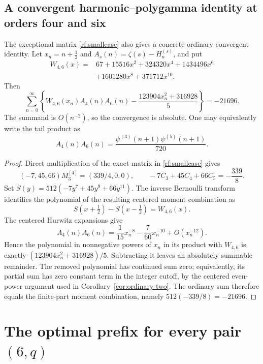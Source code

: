 \documentclass[11pt,a4paper]{article}
\numberwithin{equation}{section}
\theoremstyle{plain}
\theoremstyle{definition}
\theoremstyle{remark}
\begin{document}
\subsection{A convergent harmonic--polygamma identity at orders four and six}

The exceptional matrix \eqref{rf:smallcase} also gives a concrete
ordinary convergent identity.  Let $x_n=n+\tfrac12$ and
$A_s(n)=\zeta(s)-H_n^{(s)}$, and put
\[
 \begin{split}
 W_{4,6}(x)={}&67+15516x^2+324320x^4+1434496x^6\\
              &+1601280x^8+371712x^{10}.
 \end{split}
\]
Then
\begin{equation}\label{rf:ordinary-46}
 \boxed{\displaystyle
 \sum_{n=0}^{\infty}\left\{
 W_{4,6}(x_n)A_4(n)A_6(n)
 -\frac{123904x_n^2+316928}{5}\right\}=-21696.}
\end{equation}
The summand is $O(n^{-2})$, so the convergence is absolute.
One may equivalently write the tail product as
\[
 A_4(n)A_6(n)
 =\frac{\psi^{(3)}(n+1)\psi^{(5)}(n+1)}{720}.
\]

\begin{proof}
Direct multiplication of the exact matrix in
\eqref{rf:smallcase} gives
\[
 (-7,45,66)M_3^{[4]}=(339/4,0,0),
 \qquad -7C_3+45C_4+66C_5=-\frac{339}{8}.
\]
Set $S(y)=512(-7y^7+45y^9+66y^{11})$.  The inverse Bernoulli
transform identifies the polynomial of the resulting centered
moment combination as
\[
 S(x+\tfrac12)-S(x-\tfrac12)=W_{4,6}(x).
\]
The centered Hurwitz expansions give
\[
 A_4(n)A_6(n)=\frac1{15}x_n^{-8}
              -\frac7{60}x_n^{-10}+O(x_n^{-12}).
\]
Hence the polynomial in nonnegative powers of $x_n$ in its product
with $W_{4,6}$ is exactly
$(123904x_n^2+316928)/5$.  Subtracting it leaves an absolutely
summable remainder.  The removed polynomial has continued sum zero;
equivalently, its partial sum has zero constant term in the integer cutoff, by the
centered even-power argument used in
Corollary~\ref{cor:ordinary-two}.  The ordinary sum therefore equals
the finite-part moment combination, namely
$512(-339/8)=-21696$.
\end{proof}



\section{The optimal prefix for every pair \texorpdfstring{$(6,q)$}{(6,q)}}
\label{rs:section}
\end{document}
